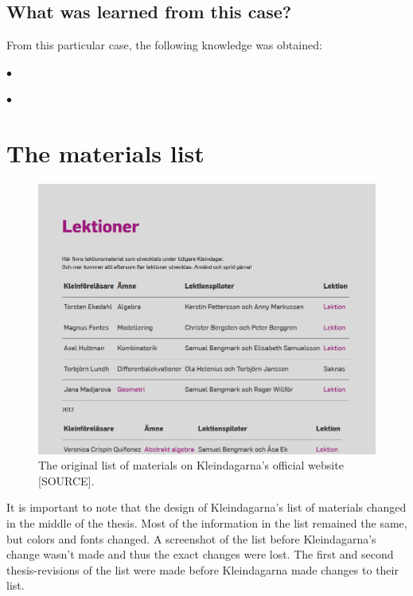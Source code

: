 \subsection{What was learned from this case?}
From this particular case, the following knowledge was obtained:
\begin{description}
    \item $\bullet$
    \item $\bullet$
\end{description}

\section{The materials list}
\begin{figure}[H]
\centering
\includegraphics[width=\linewidth]{figure/screenshot_materiallista_kleindagarna.png}
\caption{The original list of materials on Kleindagarna's official website [SOURCE].}
\end{figure}

It is important to note that the design of Kleindagarna's list of materials changed in the middle of the thesis. Most of the information in the list remained the same, but colors and fonts changed. A screenshot of the list before Kleindagarna's change wasn't made and thus the exact changes were lost. The first and second thesis-revisions of the list were made before Kleindagarna made changes to their list.

